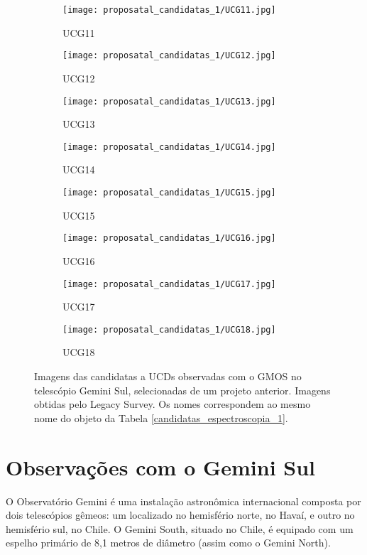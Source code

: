 \begin{figure}[!ht]
\begin{subfigure}[b]{0.22\textwidth}
        \texttt{[image: proposatal\_candidatas\_1/UCG11.jpg]}
        \caption{UCG11}
    \end{subfigure}
    \begin{subfigure}[b]{0.22\textwidth}
        \texttt{[image: proposatal\_candidatas\_1/UCG12.jpg]}
        \caption{UCG12}
    \end{subfigure}
    \begin{subfigure}[b]{0.22\textwidth}
        \texttt{[image: proposatal\_candidatas\_1/UCG13.jpg]}
        \caption{UCG13}
    \end{subfigure}
    \begin{subfigure}[b]{0.22\textwidth}
        \texttt{[image: proposatal\_candidatas\_1/UCG14.jpg]}
        \caption{UCG14}
    \end{subfigure}
    \begin{subfigure}[b]{0.22\textwidth}
        \texttt{[image: proposatal\_candidatas\_1/UCG15.jpg]}
        \caption{UCG15}
    \end{subfigure}
    \begin{subfigure}[b]{0.22\textwidth}
        \texttt{[image: proposatal\_candidatas\_1/UCG16.jpg]}
        \caption{UCG16}
    \end{subfigure}
    \begin{subfigure}[b]{0.22\textwidth}
        \texttt{[image: proposatal\_candidatas\_1/UCG17.jpg]}
        \caption{UCG17}
    \end{subfigure}
    \begin{subfigure}[b]{0.22\textwidth}
        \texttt{[image: proposatal\_candidatas\_1/UCG18.jpg]}
        \caption{UCG18}
    \end{subfigure}
    \caption{Imagens das candidatas a UCDs observadas com o GMOS no telescópio Gemini Sul, selecionadas de um projeto anterior. Imagens obtidas pelo Legacy Survey. Os nomes correspondem ao mesmo nome do objeto da Tabela \ref{candidatas_espectroscopia_1}.}
    \label{candidatas_espectroscopia_1_img}
\end{figure}

\section{Observações com o Gemini Sul}\label{sec:observacoes_gemini}
O Observatório Gemini é uma instalação astronômica internacional composta por dois telescópios gêmeos: um localizado no hemisfério norte, no Havaí, e outro no hemisfério sul, no Chile. O Gemini South, situado no Chile, é equipado com um espelho primário de 8,1 metros de diâmetro (assim como o Gemini North).

